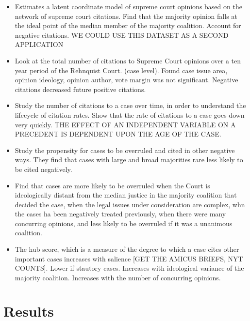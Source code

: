 \documentclass[headsepline=true, abstracton]{scrartcl}
\begin{document}
\begin{itemize}

\item \citet{clark2010locating} Estimates a latent coordinate model of supreme court opinions based on the network of supreme court citations. Find that the majority opinion falls at the ideal point of the median member of the majority coalition. Account for negative citations. WE COULD USE THIS DATASET AS A SECOND APPLICATION

\item \citet{cross2010determinants} Look at the total number of citations to Supreme Court opinions over a ten year period of the Rehnquist Court. (case level).  Found case issue area, opinion ideology, opinion author, vote margin was not significant. Negative citations decreased future positive citations.

\item \citet{black2013citation} Study the number of citations to a case over time, in order to understand the lifecycle of citation rates.  Show that the rate of citations to a case goes down very quickly. THE EFFECT OF AN INDEPENDENT VARIABLE ON A PRECEDENT IS DEPENDENT UPON THE AGE OF THE CASE.

\item \citet{benjamin2012standing} Study the propensity for cases to be overruled and cited in other negative ways. They find that cases with large and broad majorities rare less likely to be cited negatively.

\item \citet{spriggs2001explaining} Find that cases are more likely to be overruled when the Court is ideologically distant from the median justice in the majority coalition that decided the case, when the legal issues under consideration are complex, whn the cases ha been negatively treated previously, when there were many concurring opinions, and less likely to be overruled if it was a unanimous coalition.

\item \citet{lupu2013strategic} The hub score, which is a measure of the degree to which a case cites other important cases increases with salience [GET THE AMICUS BRIEFS, NYT COUNTS]. Lower if stautory cases. Increases with ideological variance of the majority coalition.  Increases with the number of concurring opinions. 

\end{itemize}


 \section{Results}
\end{document}
